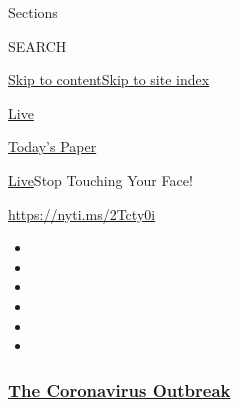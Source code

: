 Sections

SEARCH

\protect\hyperlink{site-content}{Skip to
content}\protect\hyperlink{site-index}{Skip to site index}

\href{https://www.nytimes3xbfgragh.onion/section/well/live}{Live}

\href{https://myaccount.nytimes3xbfgragh.onion/auth/login?response_type=cookie\&client_id=vi}{}

\href{https://www.nytimes3xbfgragh.onion/section/todayspaper}{Today's
Paper}

\href{/section/well/live}{Live}\textbar{}Stop Touching Your Face!

\url{https://nyti.ms/2Tcty0i}

\begin{itemize}
\item
\item
\item
\item
\item
\item
\end{itemize}

\hypertarget{the-coronavirus-outbreak}{%
\subsubsection{\texorpdfstring{\href{https://www.nytimes3xbfgragh.onion/news-event/coronavirus?name=styln-coronavirus-national\&region=TOP_BANNER\&variant=undefined\&block=storyline_menu_recirc\&action=click\&pgtype=Article\&impression_id=34b59ff0-e392-11ea-b455-d1693a15a47a}{The
Coronavirus
Outbreak}}{The Coronavirus Outbreak}}\label{the-coronavirus-outbreak}}

